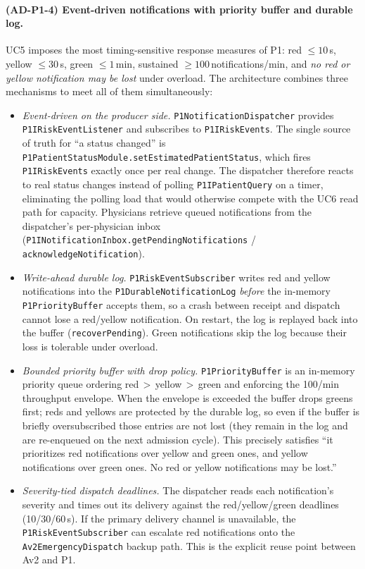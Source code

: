 \paragraph{(AD-P1-4) Event-driven notifications with priority buffer and
durable log.}
UC5 imposes the most timing-sensitive response measures of P1:
red $\leq 10$\,s, yellow $\leq 30$\,s, green $\leq 1$\,min, sustained
$\geq 100$\,notifications/min, and \emph{no red or yellow notification
may be lost} under overload. The architecture combines three mechanisms
to meet all of them simultaneously:
\begin{itemize}
  \item \emph{Event-driven on the producer side.}
        \texttt{P1NotificationDispatcher} provides
        \texttt{P1IRiskEventListener} and subscribes to
        \texttt{P1IRiskEvents}. The single source of truth for ``a status
        changed'' is
        \texttt{P1PatientStatusModule.setEstimatedPatientStatus}, which
        fires \texttt{P1IRiskEvents} exactly once per real change. The
        dispatcher therefore reacts to real status changes instead of
        polling \texttt{P1IPatientQuery} on a timer, eliminating the
        polling load that would otherwise compete with the UC6 read
        path for capacity. Physicians retrieve queued notifications from
        the dispatcher's per-physician inbox
        (\texttt{P1INotificationInbox.getPendingNotifications} /
        \texttt{acknowledgeNotification}).
  \item \emph{Write-ahead durable log.} \texttt{P1RiskEventSubscriber}
        writes red and yellow notifications into the
        \texttt{P1DurableNotificationLog} \emph{before} the in-memory
        \texttt{P1PriorityBuffer} accepts them, so a crash between
        receipt and dispatch cannot lose a red/yellow notification. On
        restart, the log is replayed back into the buffer
        (\texttt{recoverPending}). Green notifications skip the log
        because their loss is tolerable under overload.
  \item \emph{Bounded priority buffer with drop policy.}
        \texttt{P1PriorityBuffer} is an in-memory priority queue ordering
        red\,$>$\,yellow\,$>$\,green and enforcing the 100/min throughput
        envelope. When the envelope is exceeded the buffer drops greens
        first; reds and yellows are protected by the durable log, so even
        if the buffer is briefly oversubscribed those entries are not
        lost (they remain in the log and are re-enqueued on the next
        admission cycle). This precisely satisfies ``it prioritizes red
        notifications over yellow and green ones, and yellow
        notifications over green ones. No red or yellow notifications may
        be lost.''
  \item \emph{Severity-tied dispatch deadlines.} The dispatcher reads
        each notification's severity and times out its delivery against
        the red/yellow/green deadlines (10/30/60\,s). If the primary
        delivery channel is unavailable, the
        \texttt{P1RiskEventSubscriber} can escalate red notifications
        onto the \texttt{Av2EmergencyDispatch} backup path. This is the
        explicit reuse point between Av2 and P1.
\end{itemize}


